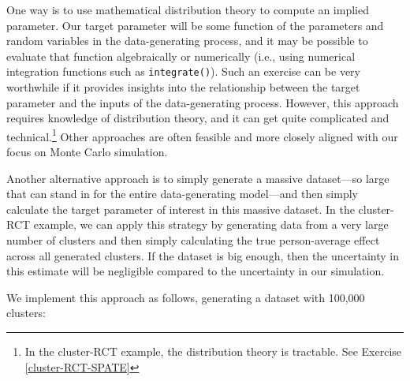 \documentclass[
]{book}
\newenvironment{Shaded}{\begin{snugshade}}{\end{snugshade}}
\newcommand{\AttributeTok}[1]{\textcolor[rgb]{0.13,0.29,0.53}{#1}}
\newcommand{\DecValTok}[1]{\textcolor[rgb]{0.00,0.00,0.81}{#1}}
\newcommand{\FloatTok}[1]{\textcolor[rgb]{0.00,0.00,0.81}{#1}}
\newcommand{\FunctionTok}[1]{\textcolor[rgb]{0.13,0.29,0.53}{\textbf{#1}}}
\newcommand{\NormalTok}[1]{#1}
\newcommand{\OtherTok}[1]{\textcolor[rgb]{0.56,0.35,0.01}{#1}}
\newcommand{\SpecialCharTok}[1]{\textcolor[rgb]{0.81,0.36,0.00}{\textbf{#1}}}
\begin{document}
One way is to use mathematical distribution theory to compute an implied parameter.
Our target parameter will be some function of the parameters and random variables in the data-generating process, and it may be possible to evaluate that function algebraically or numerically (i.e., using numerical integration functions such as \texttt{integrate()}).
Such an exercise can be very worthwhile if it provides insights into the relationship between the target parameter and the inputs of the data-generating process.
However, this approach requires knowledge of distribution theory, and it can get quite complicated and technical.\footnote{In the cluster-RCT example, the distribution theory is tractable. See Exercise \ref{cluster-RCT-SPATE}}
Other approaches are often feasible and more closely aligned with our focus on Monte Carlo simulation.

Another alternative approach is to simply generate a massive dataset---so large that can stand in for the entire data-generating model---and then simply calculate the target parameter of interest in this massive dataset. In the cluster-RCT example, we can apply this strategy by generating data from a very large number of clusters and then simply calculating the true person-average effect across all generated clusters.
If the dataset is big enough, then the uncertainty in this estimate will be negligible compared to the uncertainty in our simulation.

We implement this approach as follows, generating a dataset with 100,000 clusters:

\begin{Shaded}
\end{Shaded}
\end{document}
